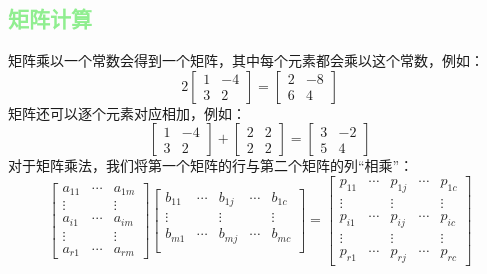 \documentclass[lang=cn,12pt]{elegantbook}
\begin{document}
\subsection{\textcolor{lightgreen}{矩阵计算}}

矩阵乘以一个常数会得到一个矩阵，其中每个元素都会乘以这个常数，例如：
$$
  2\left[\begin{array}{rr}
      1 & -4 \\
      3 & 2
    \end{array}\right]=\left[\begin{array}{rr}
      2 & -8 \\
      6 & 4
    \end{array}\right]
$$
矩阵还可以逐个元素对应相加，例如：
$$
  \left[\begin{array}{rr}
      1 & -4 \\
      3 & 2
    \end{array}\right]+\left[\begin{array}{ll}
      2 & 2 \\
      2 & 2
    \end{array}\right]=\left[\begin{array}{rr}
      3 & -2 \\
      5 & 4
    \end{array}\right]
$$
对于矩阵乘法，我们将第一个矩阵的行与第二个矩阵的列“相乘”：
$$
  \begin{bmatrix}
    a_{11} & \cdots & a_{1m} \\
    \vdots &        & \vdots \\
    a_{i1} & \cdots & a_{im} \\
    \vdots &        & \vdots \\
    a_{r1} & \cdots & a_{rm}
  \end{bmatrix}
  \begin{bmatrix}
    b_{11} & \cdots & b_{1j} & \cdots & b_{1c} \\
    \vdots &        & \vdots &        & \vdots \\
    b_{m1} & \cdots & b_{mj} & \cdots & b_{mc} \\
  \end{bmatrix}
  =
  \begin{bmatrix}
    p_{11} & \cdots & p_{1j} & \cdots & p_{1c} \\
    \vdots &        & \vdots &        & \vdots \\
    p_{i1} & \cdots & p_{ij} & \cdots & p_{ic} \\
    \vdots &        & \vdots &        & \vdots \\
    p_{r1} & \cdots & p_{rj} & \cdots & p_{rc}
  \end{bmatrix}
$$
\end{document}
